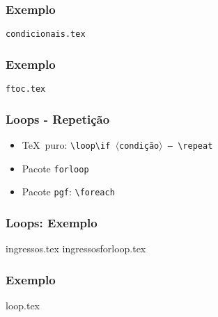 \documentclass{beamer}
\newcommand{\code}[1]{\texttt{#1}}
\begin{document}
\begin{frame}
   \frametitle{Exemplo}
   \begin{center}
      \begin{block}{}
         \begin{center}
            \code{condicionais.tex}
         \end{center}
      \end{block}
   \end{center}
\end{frame}
\begin{frame}
   \frametitle{Exemplo}
   \begin{center}
      \begin{block}{}
         \begin{center}
            \code{ftoc.tex}
         \end{center}
      \end{block}
   \end{center}
\end{frame}
\begin{frame}
   \frametitle{Loops - Repetição}
   \begin{itemize}
      \item \TeX\ puro: \code{\textbackslash loop\textbackslash if $\langle$condição$\rangle$ -- \textbackslash repeat}
      \item Pacote \code{forloop}
      \item Pacote \code{pgf}: \code{\textbackslash foreach}
   \end{itemize}
\end{frame}
\begin{frame}
   \frametitle{Loops: Exemplo}
   \begin{center}
      \begin{block}{}
         \begin{center}
            ingressos.tex \qquad ingressos\underline{}forloop.tex
         \end{center}
      \end{block}
   \end{center}
\end{frame}
\begin{frame}
   \frametitle{Exemplo}
   \begin{center}
      \begin{block}{}
         \begin{center}
            loop.tex
         \end{center}
      \end{block}
   \end{center}
\end{frame}
\end{document}
